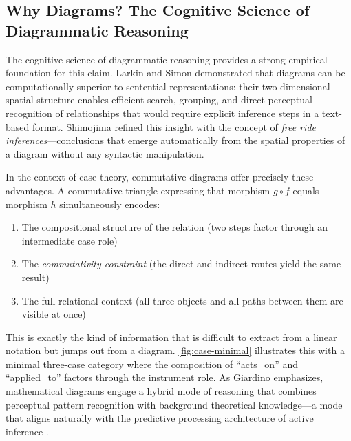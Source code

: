 \documentclass[
]{article}
\providecommand{\tightlist}{%
  \setlength{\itemsep}{0pt}\setlength{\parskip}{0pt}}
\numberwithin{equation}{section}
\begin{document}
\subsection{Why Diagrams? The Cognitive Science of Diagrammatic
Reasoning}\label{why-diagrams-the-cognitive-science-of-diagrammatic-reasoning}

The cognitive science of diagrammatic reasoning provides a strong
empirical foundation for this claim. Larkin and Simon
\citeyearpar{larkin1987diagram} demonstrated that diagrams can be
computationally superior to sentential representations: their
two-dimensional spatial structure enables efficient search, grouping,
and direct perceptual recognition of relationships that would require
explicit inference steps in a text-based format. Shimojima
\citeyearpar{shimojima1996reasoning} refined this insight with the
concept of \emph{free ride inferences}---conclusions that emerge
automatically from the spatial properties of a diagram without any
syntactic manipulation.

In the context of case theory, commutative diagrams offer precisely
these advantages. A commutative triangle expressing that morphism
\(g \circ f\) equals morphism \(h\) simultaneously encodes:

\begin{enumerate}
\def\labelenumi{\arabic{enumi}.}
\tightlist
\item
  The compositional structure of the relation (two steps factor through
  an intermediate case role)
\item
  The \emph{commutativity constraint} (the direct and indirect routes
  yield the same result)
\item
  The full relational context (all three objects and all paths between
  them are visible at once)
\end{enumerate}

This is exactly the kind of information that is difficult to extract
from a linear notation but jumps out from a diagram.
\autoref{fig:case-minimal} illustrates this with a minimal three-case
category where the composition of ``acts\_on'' and ``applied\_to''
factors through the instrument role. As Giardino
\citeyearpar{giardino2017diagrammatic} emphasizes, mathematical diagrams
engage a hybrid mode of reasoning that combines perceptual pattern
recognition with background theoretical knowledge---a mode that aligns
naturally with the predictive processing architecture of active
inference \citep{friston2017active}.
\end{document}
